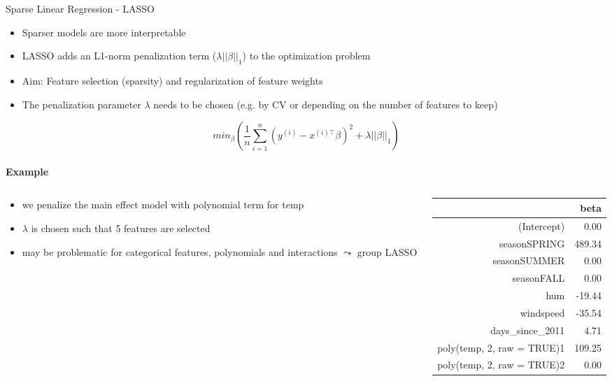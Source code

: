 \documentclass[11pt,compress,t,notes=noshow, aspectratio=169, xcolor=table]{beamer}
\begin{document}
\begin{frame}{Sparse Linear Regression - LASSO}
\begin{itemize}
    \item Sparser models are more interpretable
    \item LASSO adds an L1-norm penalization term ($\lambda||\beta||_1$) to the optimization problem
    \item Aim: Feature selection (sparsity) and regularization of feature weights
    \item The penalization parameter $\lambda$ needs to be chosen (e.g. by CV or depending on the number of features to keep)
\end{itemize}


$$
min_{\beta} \left(\frac{1}{n} \sum_{i=1}^{n} (y^{(i)} - x^{(i)\top}\beta)^2 + \lambda||\beta||_1\right)
$$
\vspace*{0.2cm}\\
\textbf{Example}
\vspace*{-0.4cm}
\begin{columns}
\begin{column}{0.65\textwidth}
\begin{itemize}
    \item we penalize the main effect model with polynomial term for temp
    \item $\lambda$ is chosen such that 5 features are selected
    \item may be problematic for categorical features, polynomials and interactions $\leadsto$ group LASSO 
\end{itemize}
\end{column}
\begin{column}{0.35\textwidth}
\tiny
\begin{table}[ht]
\centering
\begin{tabular}{rr}
  \hline
 & beta \\ 
  \hline
(Intercept) & 0.00 \\ 
  seasonSPRING & 489.34 \\ 
  seasonSUMMER & 0.00 \\ 
  seasonFALL & 0.00 \\ 
  hum & -19.44 \\ 
  windspeed & -35.54 \\ 
  days\_since\_2011 & 4.71 \\ 
  poly(temp, 2, raw = TRUE)1 & 109.25 \\ 
  poly(temp, 2, raw = TRUE)2 & 0.00 \\ 
   \hline
\end{tabular}
\end{table}
\end{column}
\end{columns}

\end{frame}
\end{document}
